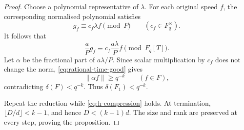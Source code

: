 \documentclass[10pt,a4paper]{amsart}
\newcommand{\Fq}{\mathbb F_q}
\newcommand{\cF}{\mathcal F}
\def\mathbb#1{#1}%
\def\mathcal#1{#1}%
\newcommand{\norm}[1]{\lVert#1\rVert}
\begin{document}
\begin{proof}
Choose a polynomial representative of $\lambda$.  For each original speed $f$, the corresponding normalised polynomial satisfies
\[
 g_f\equiv c_f\lambda f\pmod P
 \qquad(c_f\in\Fq^\times).
\]
It follows that
\[
 \frac aP g_f
 \equiv
 c_f\frac{a\lambda}{P}f
 \pmod{\Fq[T]}.
\]
Let $\alpha$ be the fractional part of $a\lambda/P$.  Since scalar multiplication by $c_f$ does not change the norm, \eqref{eq:rational-time-good} gives
\[
 \norm{\alpha f}\ge q^{-k}
 \qquad(f\in\cF),
\]
contradicting $\delta(\cF)<q^{-k}$.  Thus
$\delta(\cF_1)<q^{-k}$.

Repeat the reduction while \eqref{eq:h-compression} holds.  At termination,
$\lfloor D/d\rfloor<k-1$, and hence $D<(k-1)d$.  The size and rank are preserved at every step, proving the proposition.
\end{proof}
\end{document}
